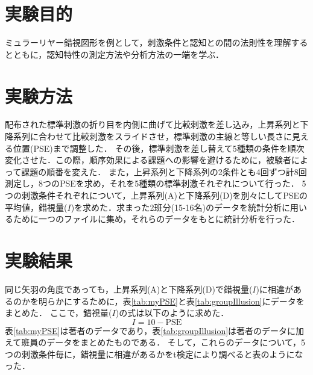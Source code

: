 \documentclass{jlreq}
\begin{document}
\tableofcontents
\clearpage

\section{実験目的}
ミュラーリヤー錯視図形を例として，刺激条件と認知との間の法則性を理解するとともに，認知特性の測定方法や分析方法の一端を学ぶ．

\section{実験方法}
配布された標準刺激の折り目を内側に曲げて比較刺激を差し込み，上昇系列と下降系列に合わせて比較刺激をスライドさせ，標準刺激の主線と等しい長さに見える位置(PSE)まで調整した．
その後，標準刺激を差し替えて5種類の条件を順次変化させた．この際，順序効果による課題への影響を避けるために，被験者によって課題の順番を変えた．
また，上昇系列と下降系列の2条件とも4回ずつ計8回測定し，8つのPSEを求め，それを5種類の標準刺激それぞれについて行った．
5つの刺激条件それぞれについて，上昇系列(A)と下降系列(D)を別々にしてPSEの平均値，錯視量($I$)を求めた．求まった2班分(15-16名)のデータを統計分析に用いるために一つのファイルに集め，それらのデータをもとに統計分析を行った．

\section{実験結果}
同じ矢羽の角度であっても，上昇系列(A)と下降系列(D)で錯視量($I$)に相違があるのかを明らかにするために，表\ref{tab:myPSE}と表\ref{tab:groupIllusion}にデータをまとめた．
ここで，錯視量($I$)の式は以下のように求めた．
\begin{equation}
    I = 10 - \text{PSE}
\end{equation}
表\ref{tab:myPSE}は著者のデータであり，表\ref{tab:groupIllusion}は著者のデータに加えて班員のデータをまとめたものである．
そして，これらのデータについて，5つの刺激条件毎に，錯視量に相違があるかをt検定により調べると表のようになった．
\end{document}
